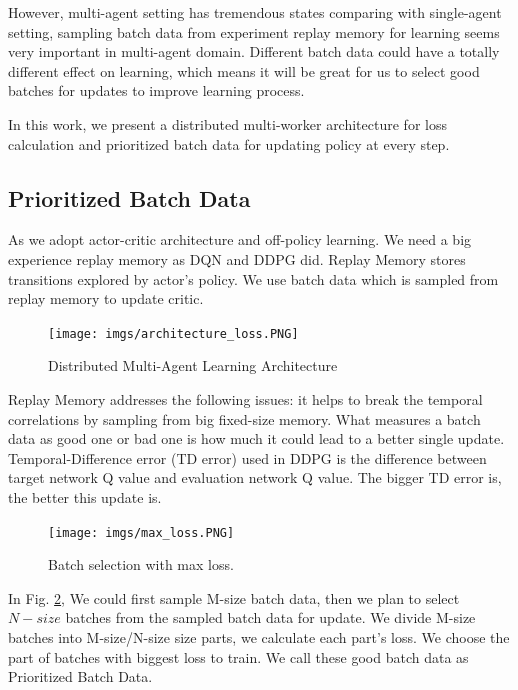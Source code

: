 \documentclass[11pt,twocolumn]{jarticle} %
\begin{document}
However, multi-agent setting has tremendous states comparing with single-agent setting, sampling batch data from experiment replay memory for learning seems very important in multi-agent domain. Different batch data could have a totally different effect on learning, which means it will be great for us to select good batches for updates to improve learning process. \par

In this work, we present a distributed multi-worker architecture for loss calculation and prioritized batch data for updating policy at every step.

\subsection{Prioritized Batch Data}

As we adopt actor-critic architecture and off-policy learning. We need a big experience replay memory as DQN and DDPG did. Replay Memory stores transitions explored by actor's policy. We use batch data which is sampled from replay memory to update critic. \par 

\begin{figure}[ht]
 \begin{center}
  \texttt{[image: imgs/architecture\_loss.PNG]}
  \caption{Distributed Multi-Agent Learning Architecture}
  \label{fig:architecture}
 \end{center}
\end{figure}

Replay Memory addresses the following issues: it helps to break the temporal correlations by sampling from big fixed-size memory. What measures a batch data as good one or bad one is how much it could lead to a better single update. Temporal-Difference error (TD error) used in DDPG is the difference between target network Q value and evaluation network Q value. The bigger TD error is, the better this update is. \par
\begin{figure}[h]
 \begin{center}
  \texttt{[image: imgs/max\_loss.PNG]}
  \caption{
  Batch selection with max loss.
  }
  \label{fig:max_loss}
 \end{center}
\end{figure}


In Fig. \ref{fig:max_loss}, We could first sample M-size batch data, then we plan to select $N-size$ batches from the sampled batch data for update. We divide M-size batches into M-size/N-size size parts, we calculate each part's loss. We choose the part of batches with biggest loss to train. We call these good batch data as Prioritized Batch Data. \par
\end{document}
